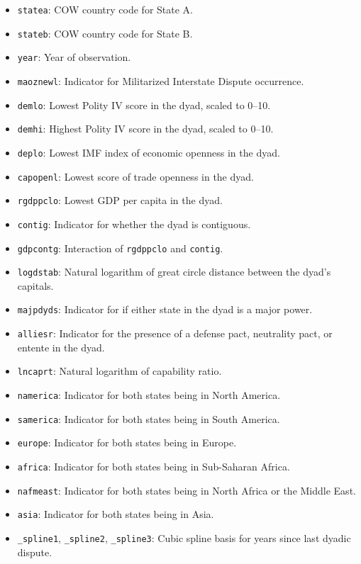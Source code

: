 \documentclass[12pt]{article}
\begin{document}
\begin{itemize}
  \item \texttt{statea}: COW country code for State A.
  \item \texttt{stateb}: COW country code for State B.
  \item \texttt{year}: Year of observation.
  \item \texttt{maoznewl}: Indicator for Militarized Interstate Dispute occurrence.
  \item \texttt{demlo}: Lowest Polity IV score in the dyad, scaled to 0--10.
  \item \texttt{demhi}: Highest Polity IV score in the dyad, scaled to 0--10.
  \item \texttt{deplo}: Lowest IMF index of economic openness in the dyad.
  \item \texttt{capopenl}: Lowest score of trade openness in the dyad.
  \item \texttt{rgdppclo}: Lowest GDP per capita in the dyad.
  \item \texttt{contig}: Indicator for whether the dyad is contiguous.
  \item \texttt{gdpcontg}: Interaction of \texttt{rgdppclo} and \texttt{contig}.
  \item \texttt{logdstab}: Natural logarithm of great circle distance between the dyad's capitals.
  \item \texttt{majpdyds}: Indicator for if either state in the dyad is a major power.
  \item \texttt{alliesr}: Indicator for the presence of a defense pact, neutrality pact, or entente in the dyad.  
  \item \texttt{lncaprt}: Natural logarithm of capability ratio.
  \item \texttt{namerica}: Indicator for both states being in North America.
  \item \texttt{samerica}: Indicator for both states being in South America.
  \item \texttt{europe}: Indicator for both states being in Europe.
  \item \texttt{africa}: Indicator for both states being in Sub-Saharan Africa.
  \item \texttt{nafmeast}: Indicator for both states being in North Africa or the Middle East.
  \item \texttt{asia}: Indicator for both states being in Asia.
  \item \texttt{\_spline1}, \texttt{\_spline2}, \texttt{\_spline3}: Cubic spline basis for years since last dyadic dispute.
\end{itemize}
\end{document}
